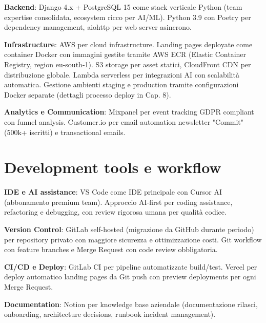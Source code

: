 \textbf{Backend}: Django 4.x + PostgreSQL 15 come stack verticale Python (team expertise consolidata, ecosystem ricco per AI/ML). Python 3.9 con Poetry per dependency management, aiohttp per web server asincrono.

\textbf{Infrastructure}: AWS per cloud infrastructure. Landing pages deployate come container Docker con immagini gestite tramite AWS ECR (Elastic Container Registry, region eu-south-1). S3 storage per asset statici, CloudFront CDN per distribuzione globale. Lambda serverless per integrazioni AI con scalabilità automatica. Gestione ambienti staging e production tramite configurazioni Docker separate (dettagli processo deploy in Cap. 8).

\textbf{Analytics e Communication}: Mixpanel per event tracking GDPR compliant con funnel analysis. Customer.io per email automation newsletter "Commit" (500k+ iscritti) e transactional emails.

\section{Development tools e workflow}

\textbf{IDE e AI assistance}: VS Code come IDE principale con Cursor AI (abbonamento premium team). Approccio AI-first per coding assistance, refactoring e debugging, con review rigorosa umana per qualità codice.

\textbf{Version Control}: GitLab self-hosted (migrazione da GitHub durante periodo) per repository privato con maggiore sicurezza e ottimizzazione costi. Git workflow con feature branches e Merge Request con code review obbligatoria.

\textbf{CI/CD e Deploy}: GitLab CI per pipeline automatizzate build/test. Vercel per deploy automatico landing pages da Git push con preview deployments per ogni Merge Request.

\textbf{Documentation}: Notion per knowledge base aziendale (documentazione rilasci, onboarding, architecture decisions, runbook incident management).